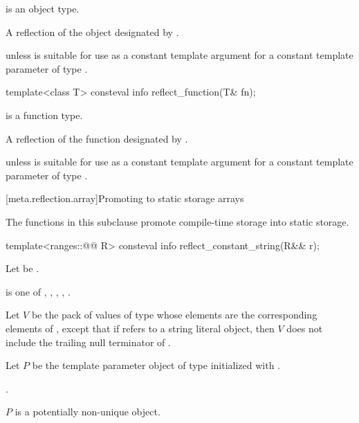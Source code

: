 \begin{itemdescr}
\pnum
\mandates
{} is an object type.

\pnum
\returns
A reflection of the object designated by .

\pnum
\throws
{} unless
 is suitable for use as a constant template argument
for a constant template parameter of type .
\end{itemdescr}

%
\begin{itemdecl}
template<class T>
  consteval info reflect_function(T& fn);
\end{itemdecl}

\begin{itemdescr}
\pnum
\mandates
{} is a function type.

\pnum
\returns
A reflection of the function designated by .

\pnum
\throws
{} unless
 is suitable for use as a constant template argument
for a constant template parameter of type .
\end{itemdescr}

[meta.reflection.array]{Promoting to static storage arrays}

\pnum
The functions in this subclause promote compile-time storage into static storage.

%
\begin{itemdecl}
template<ranges::@@ R>
  consteval info reflect_constant_string(R&& r);
\end{itemdecl}

\begin{itemdescr}
\pnum
Let  be .

\pnum
\mandates
{} is one of
,
,
,
,
.

\pnum
Let $V$ be the pack of values of type 
whose elements are the corresponding elements of ,
except that if  refers to a string literal object,
then $V$ does not include the trailing null terminator of .

\pnum
Let $P$ be the template parameter object
of type 
initialized with .

\pnum
\returns
{}.

\pnum
\begin{note}
$P$ is a potentially non-unique object.
\end{note}
\end{itemdescr}

